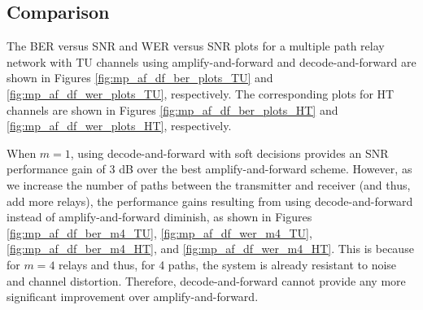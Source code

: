 \subsection{Comparison}
\label{subsec:mp_bws_c}

The BER versus SNR and WER versus SNR plots for a multiple path relay network with TU channels using amplify-and-forward and decode-and-forward are shown in Figures \ref{fig:mp_af_df_ber_plots_TU} and \ref{fig:mp_af_df_wer_plots_TU}, respectively.  The corresponding plots for HT channels are shown in Figures \ref{fig:mp_af_df_ber_plots_HT} and \ref{fig:mp_af_df_wer_plots_HT}, respectively.

When $m=1$, using decode-and-forward with soft decisions provides an SNR performance gain of 3 dB over the best amplify-and-forward scheme.  However, as we increase the number of paths between the transmitter and receiver (and thus, add more relays), the performance gains resulting from using decode-and-forward instead of amplify-and-forward diminish, as shown in Figures \ref{fig:mp_af_df_ber_m4_TU}, \ref{fig:mp_af_df_wer_m4_TU}, \ref{fig:mp_af_df_ber_m4_HT}, and \ref{fig:mp_af_df_wer_m4_HT}.  This is because for $m=4$ relays and thus, for 4 paths, the system is already resistant to noise and channel distortion.  Therefore, decode-and-forward cannot provide any more significant improvement over amplify-and-forward.


